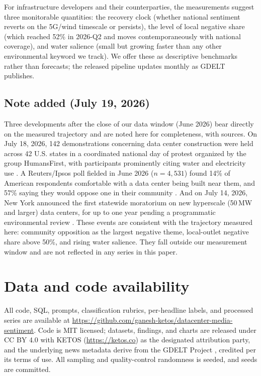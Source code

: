 \documentclass[11pt]{article}
\begin{document}
For infrastructure developers and their counterparties, the measurements
suggest three monitorable quantities: the recovery clock (whether national
sentiment reverts on the 5G/wind timescale or persists), the level of local
negative share (which reached 52\% in 2026-Q2 and moves contemporaneously
with national coverage), and water salience (small but growing faster than
any other environmental keyword we track). We offer these as descriptive
benchmarks rather than forecasts; the released pipeline updates monthly as
GDELT publishes.

\subsection*{Note added (July 19, 2026)}

Three developments after the close of our data window (June 2026) bear
directly on the measured trajectory and are noted here for completeness,
with sources. On July 18, 2026, 142 demonstrations concerning data center
construction were held across 42 U.S. states in a coordinated national day
of protest organized by the group HumansFirst, with participants
prominently citing water and electricity use \cite{reuters2026protests}. A
Reuters/Ipsos poll fielded in June 2026 ($n=4{,}531$) found 14\% of
American respondents comfortable with a data center being built near them,
and 57\% saying they would oppose one in their community
\cite{ipsos2026}. And on July 14, 2026, New York announced the first
statewide moratorium on new hyperscale (50\,MW and larger) data centers,
for up to one year pending a programmatic environmental review
\cite{nygov2026}. These events are consistent with the trajectory measured
here: community opposition as the largest negative theme, local-outlet
negative share above 50\%, and rising water salience. They fall outside
our measurement window and are not reflected in any series in this paper.

\section*{Data and code availability}

All code, SQL, prompts, classification rubrics, per-headline labels, and
processed series are available at
\url{https://github.com/ganesh-ketos/datacenter-media-sentiment}. Code is MIT
licensed; datasets, findings, and charts are released under CC BY 4.0 with
KETOS (\url{https://ketos.co}) as the designated attribution party, and the
underlying news metadata derive from the GDELT Project \cite{gdeltweb},
credited per its terms of use. All sampling and quality-control randomness
is seeded, and seeds are committed.
\end{document}
